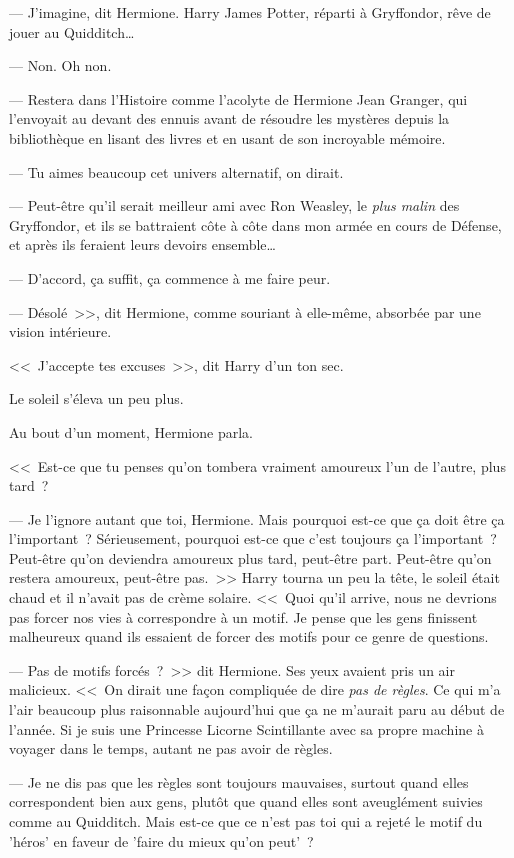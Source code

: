 --- J'imagine, dit Hermione. Harry James Potter, réparti à Gryffondor, rêve de jouer au Quidditch…

--- Non. Oh non.

--- Restera dans l'Histoire comme l'acolyte de Hermione Jean Granger, qui l'envoyait au devant des ennuis avant de résoudre les mystères depuis la bibliothèque en lisant des livres et en usant de son incroyable mémoire.

--- Tu aimes beaucoup cet univers alternatif, on dirait.

--- Peut-être qu'il serait meilleur ami avec Ron Weasley, le \emph{plus malin} des Gryffondor, et ils se battraient côte à côte dans mon armée en cours de Défense, et après ils feraient leurs devoirs ensemble…

--- D'accord, ça suffit, ça commence à me faire peur.

--- Désolé~>>, dit Hermione, comme souriant à elle-même, absorbée par une vision intérieure.

<<~J'accepte tes excuses~>>, dit Harry d'un ton sec.

Le soleil s'éleva un peu plus.

Au bout d'un moment, Hermione parla.

<<~Est-ce que tu penses qu'on tombera vraiment amoureux l'un de l'autre, plus tard~?

--- Je l'ignore autant que toi, Hermione. Mais pourquoi est-ce que ça doit être ça l'important~? Sérieusement, pourquoi est-ce que c'est toujours ça l'important~? Peut-être qu'on deviendra amoureux plus tard, peut-être part. Peut-être qu'on restera amoureux, peut-être pas.~>> Harry tourna un peu la tête, le soleil était chaud et il n'avait pas de crème solaire. <<~Quoi qu'il arrive, nous ne devrions pas forcer nos vies à correspondre à un motif. Je pense que les gens finissent malheureux quand ils essaient de forcer des motifs pour ce genre de questions.

--- Pas de motifs forcés~?~>> dit Hermione. Ses yeux avaient pris un air malicieux. <<~On dirait une façon compliquée de dire \emph{pas de règles}. Ce qui m'a l'air beaucoup plus raisonnable aujourd'hui que ça ne m'aurait paru au début de l'année. Si je suis une Princesse Licorne Scintillante avec sa propre machine à voyager dans le temps, autant ne pas avoir de règles.

--- Je ne dis pas que les règles sont toujours mauvaises, surtout quand elles correspondent bien aux gens, plutôt que quand elles sont aveuglément suivies comme au Quidditch. Mais est-ce que ce n'est pas toi qui a rejeté le motif du 'héros' en faveur de 'faire du mieux qu'on peut'~?

